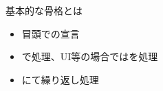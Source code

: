 \documentclass[dvipdfmx]{beamer}
\begin{document}
  \begin{frame}{基本的な骨格とは}
    \begin{itemize}
      \item 冒頭での宣言
      \item {}で処理、UI等の場合ではを処理
      \item {}にて繰り返し処理
    \end{itemize}
  \end{frame}
\end{document}
